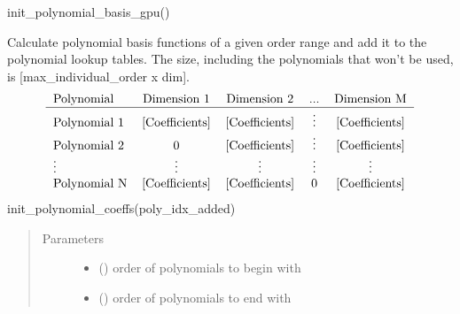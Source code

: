 \documentclass[letterpaper,10pt,english,openany,oneside]{sphinxmanual}
\begin{document}
\begin{fulllineitems}
\begin{fulllineitems}
init\_polynomial\_basis\_gpu()

\end{fulllineitems}


\begin{fulllineitems}
\label{\detokenize{pygpc:pygpc.gpc.gPC.init_polynomial_coeffs}}
Calculate polynomial basis functions of a given order range and add it to the polynomial lookup tables.
The size, including the polynomials that won’t be used, is {[}max\_individual\_order x dim{]}.
\begin{equation*}
\begin{split}\begin{tabular}{l*{4}{c}}
 Polynomial          & Dimension 1 & Dimension 2 & ... & Dimension M \\
\hline
 Polynomial 1        & [Coefficients] & [Coefficients] & \vdots & [Coefficients] \\
 Polynomial 2        & 0 & [Coefficients] & \vdots & [Coefficients] \\
\vdots              & \vdots & \vdots & \vdots & \vdots \\
 Polynomial N        & [Coefficients] & [Coefficients] & 0 & [Coefficients] \\
\end{tabular}\end{split}
\end{equation*}
init\_polynomial\_coeffs(poly\_idx\_added)
\begin{quote}\begin{description}
\item[{Parameters}] \leavevmode\begin{itemize}
\item {} 
 () \textendash{} order of polynomials to begin with

\item {} 
 () \textendash{} order of polynomials to end with

\end{itemize}

\end{description}\end{quote}


\end{fulllineitems}
\end{fulllineitems}
\end{document}
